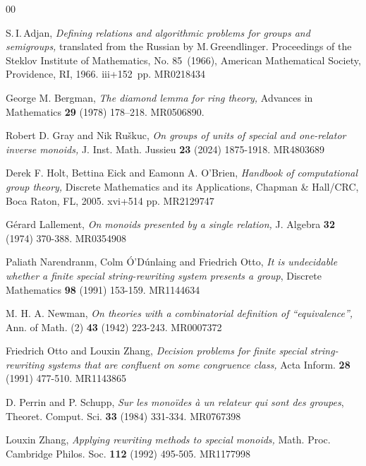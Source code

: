 \documentclass{amsart}
\numberwithin{equation}{section}
\begin{document}
\begin{thebibliography}{00}

  S.\,I.\,Adjan,
{\em Defining relations and algorithmic problems for groups
and semigroups,}
translated from the Russian by M.\,Greendlinger.
Proceedings of the Steklov Institute of Mathematics, No. 85~(1966),
American Mathematical Society, Providence, RI, 1966. iii+152~pp.
MR0218434

\bibitem{<>} George M. Bergman,
{\em The diamond lemma for ring theory,}
Advances in Mathematics {\bf 29} (1978) 178--218.
MR0506890.

 Robert D. Gray and Nik Ruškuc,
{\em On groups of units of special and one-relator inverse monoids,}
J. Inst. Math. Jussieu {\bf 23} (2024) 1875-1918.
MR4803689

 Derek F. Holt, Bettina Eick and Eamonn A. O'Brien,
{\em Handbook of computational group theory,}
Discrete Mathematics and its Applications,
Chapman \& Hall/CRC, Boca Raton, FL, 2005. xvi+514 pp.
MR2129747

 Gérard Lallement,
{\em On monoids presented by a single relation,}
J. Algebra {\bf 32} (1974) 370-388.
MR0354908


 Paliath Narendranm, Colm Ó'Dúnlaing
and Friedrich Otto,
{\em It is undecidable whether a finite special string-rewriting
system presents a group}, Discrete Mathematics {\bf 98} (1991) 153-159.
MR1144634

 M. H. A. Newman,
{\em On theories with a combinatorial definition of ``equivalence'',}
Ann. of Math. (2) {\bf 43} (1942) 223-243.
MR0007372

 Friedrich Otto and Louxin Zhang,
{\em Decision problems for finite special string-rewriting systems
that are confluent on some congruence class,}
Acta Inform. {\bf 28} (1991) 477-510.
MR1143865

 D. Perrin and P. Schupp,
{\em Sur les monoïdes à un relateur qui sont des groupes},
Theoret. Comput. Sci. {\bf 33} (1984) 331-334.
MR0767398

 Louxin Zhang,
{\em Applying rewriting methods to special monoids,}
Math. Proc. Cambridge Philos. Soc. {\bf 112} (1992) 495-505.
MR1177998

\end{thebibliography}
\end{document}
